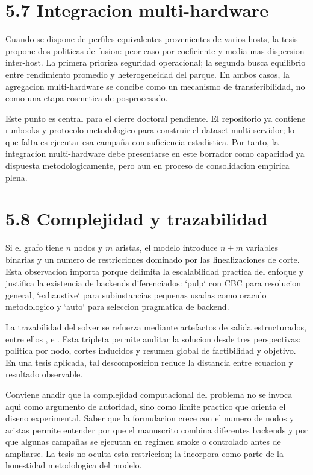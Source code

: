 \section{5.7 Integracion multi-hardware}
Cuando se dispone de perfiles equivalentes provenientes de varios hosts, la tesis propone dos politicas de fusion: peor caso por coeficiente y media mas dispersion inter-host. La primera prioriza seguridad operacional; la segunda busca equilibrio entre rendimiento promedio y heterogeneidad del parque. En ambos casos, la agregacion multi-hardware se concibe como un mecanismo de transferibilidad, no como una etapa cosmetica de posprocesado.

Este punto es central para el cierre doctoral pendiente. El repositorio ya contiene runbooks y protocolo metodologico para construir el dataset multi-servidor; lo que falta es ejecutar esa campaña con suficiencia estadistica. Por tanto, la integracion multi-hardware debe presentarse en este borrador como capacidad ya dispuesta metodologicamente, pero aun en proceso de consolidacion empirica plena.

\section{5.8 Complejidad y trazabilidad}
Si el grafo tiene $n$ nodos y $m$ aristas, el modelo introduce $n+m$ variables binarias y un numero de restricciones dominado por las linealizaciones de corte. Esta observacion importa porque delimita la escalabilidad practica del enfoque y justifica la existencia de backends diferenciados: `pulp` con CBC para resolucion general, `exhaustive` para subinstancias pequenas usadas como oraculo metodologico y `auto` para seleccion pragmatica de backend.

La trazabilidad del solver se refuerza mediante artefactos de salida estructurados, entre ellos ,  e . Esta tripleta permite auditar la solucion desde tres perspectivas: politica por nodo, cortes inducidos y resumen global de factibilidad y objetivo. En una tesis aplicada, tal descomposicion reduce la distancia entre ecuacion y resultado observable.

Conviene anadir que la complejidad computacional del problema no se invoca aqui como argumento de autoridad, sino como limite practico que orienta el diseno experimental. Saber que la formulacion crece con el numero de nodos y aristas permite entender por que el manuscrito combina diferentes backends y por que algunas campañas se ejecutan en regimen smoke o controlado antes de ampliarse. La tesis no oculta esta restriccion; la incorpora como parte de la honestidad metodologica del modelo.

